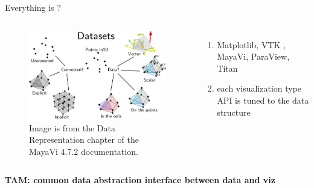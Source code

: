\documentclass[xcolor={dvipsnames}, handout]{beamer}
\begin{document}
\begin{frame}{Everything is ?}
    \begin{columns}
        \begin{figure}
            \includegraphics[width=1\textwidth]{figures/intro/dataset_diagram.png}
            \caption{Image is from the Data Representation chapter of the MayaVi 4.7.2 documentation.\cite{DataRepresentationMayavi}}
        \end{figure}
        \begin{enumerate}
            \item Matplotlib\cite{hunterMatplotlib2DGraphics2007},  VTK \cite{hanwellVisualizationToolkitVTK2015,geveci2012vtk}, MayaVi\cite{RamachandranMayaVI2011}, ParaView\cite{ahrens2005paraview}, Titan\cite{brianwylieUnifiedToolkitInformation2009}
            \item each visualization type API is tuned to the data structure
        \end{enumerate}
    \end{columns}
    \pause
    \begin{center}
        \textbf{TAM: common data abstraction interface between data and viz }
    \end{center}
\end{frame}
\end{document}
